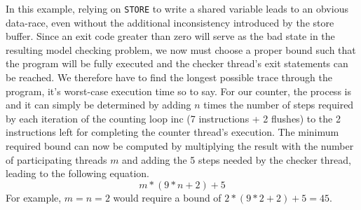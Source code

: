 In this example, relying on \lstinline[style=asm]{STORE} to write a shared variable leads to an obvious data-race, even without the additional inconsistency introduced by the store buffer.
Since an exit code greater than zero will serve as the bad state in the resulting model checking problem, we now must choose a proper bound
such that the program will be fully executed
and the checker thread's exit statements can be reached.
We therefore have to find the longest possible trace through the program, it's worst-case execution time so to say.
For our  counter, the process is  and it can simply be determined by adding $n$ times the number of steps required by each iteration of the counting loop {\color{red!60!black}\textsf{inc}} (7 instructions + 2 flushes) to the 2 instructions left for completing the counter thread's execution.
The minimum required bound can now be computed by multiplying the result with the number of participating threads $m$ and adding the 5 steps needed by the checker thread, leading to the following equation.
\[
  m * (9 * n + 2) + 5
\]
For example, $m = n = 2$ would require a bound of $2 * (9 * 2 + 2) + 5 = 45$.

